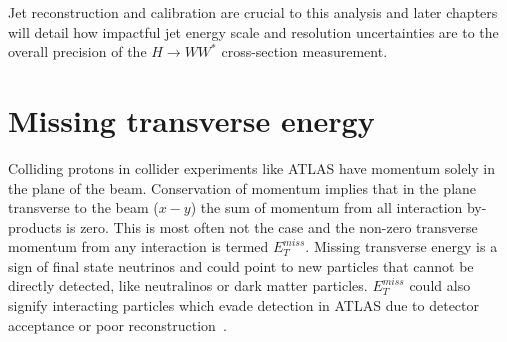 Jet reconstruction and calibration are crucial to this analysis and later chapters will detail how impactful jet energy scale and resolution uncertainties are to the overall precision of the $H\rightarrow WW^*$ cross-section measurement. 

\section{Missing transverse energy}
Colliding protons in collider experiments like ATLAS have momentum solely in the plane of the beam. Conservation of momentum implies that in the plane transverse to the beam ($x-y$) the sum of momentum from all interaction by-products is zero. This is most often not the case and the non-zero transverse momentum from any interaction is termed $E_T^{miss}$. Missing transverse energy is a sign of final state neutrinos and could point to new particles that cannot be directly detected, like neutralinos or dark matter particles. $E_T^{miss}$ could also signify interacting particles which evade detection in ATLAS due to detector acceptance or poor reconstruction~\cite{METSig}. 

